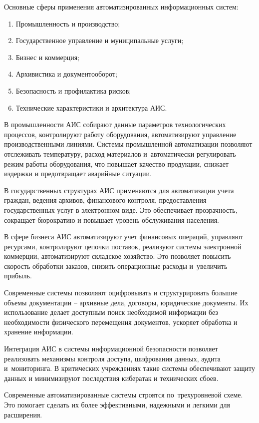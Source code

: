 \documentclass{ou}
\begin{document}
Основные сферы применения автоматизированных информационных систем:
\begin{enumerate}[leftmargin=0em, itemindent=3.75em, nosep, label=\arabic*)]
\item Промышленность и производство;
\item Государственное управление и муниципальные услуги;
\item Бизнес и коммерция;
\item Архивистика и документооборот;
\item Безопасность и профилактика рисков;
\item Технические характеристики и архитектура АИС.
\end{enumerate}

В промышленности АИС собирают данные параметров технологических процессов, контролируют работу оборудования, автоматизируют управление производственными линиями. Системы промышленной автоматизации позволяют отслеживать температуру, расход материалов и~автоматически регулировать режим работы оборудования, что повышает качество продукции, снижает издержки и предотвращает аварийные ситуации.

В государственных структурах АИС применяются для автоматизации учета граждан, ведения архивов, финансового контроля, предоставления государственных услуг в электронном виде. Это обеспечивает прозрачность, сокращает бюрократию и повышает уровень обслуживания населения.

В сфере бизнеса АИС автоматизируют учет финансовых операций, управляют ресурсами, контролируют цепочки поставок, реализуют системы электронной коммерции, автоматизируют складское хозяйство. Это позволяет повысить скорость обработки заказов, снизить операционные расходы и~увеличить прибыль.

Современные системы позволяют оцифровывать и структурировать большие объемы документации -- архивные дела, договоры, юридические документы. Их использование делает доступным поиск необходимой информации без необходимости физического перемещения документов, ускоряет обработка и хранение информации.

Интеграция АИС в системы информационной безопасности позволяет реализовать механизмы контроля доступа, шифрования данных, аудита и~мониторинга. В критических учреждениях такие системы обеспечивают защиту данных и минимизируют последствия кибератак и технических сбоев.

Современные автоматизированные системы строятся по~трехуровневой схеме. Это помогает сделать их более эффективными, надежными и легкими для расширения.
\end{document}
